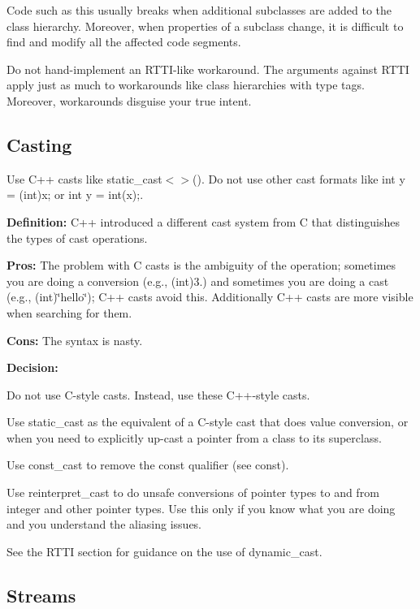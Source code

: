 Code such as this usually breaks when additional subclasses are added to the class hierarchy. Moreover, when properties of a subclass change, it is difficult to find and modify all the affected code segments.

Do not hand-\/implement an R\+T\+T\+I-\/like workaround. The arguments against R\+T\+TI apply just as much to workarounds like class hierarchies with type tags. Moreover, workarounds disguise your true intent.

\subsection*{Casting}

Use C++ casts like {\ttfamily static\+\_\+cast$<$$>$()}. Do not use other cast formats like {\ttfamily int y = (int)x; or int y = int(x);}.

{\bfseries Definition\+:} C++ introduced a different cast system from C that distinguishes the types of cast operations.

{\bfseries Pros\+:} The problem with C casts is the ambiguity of the operation; sometimes you are doing a conversion (e.\+g., (int)3.) and sometimes you are doing a cast (e.\+g., (int)\char`\"{}hello\char`\"{}); C++ casts avoid this. Additionally C++ casts are more visible when searching for them.

{\bfseries Cons\+:} The syntax is nasty.

{\bfseries Decision\+:}

Do not use C-\/style casts. Instead, use these C++-\/style casts.


\begin{DoxyItemize}
\item Use {\ttfamily static\+\_\+cast} as the equivalent of a C-\/style cast that does value conversion, or when you need to explicitly up-\/cast a pointer from a class to its superclass.
\item Use {\ttfamily const\+\_\+cast} to remove the const qualifier (see const).
\item Use {\ttfamily reinterpret\+\_\+cast} to do unsafe conversions of pointer types to and from integer and other pointer types. Use this only if you know what you are doing and you understand the aliasing issues.
\end{DoxyItemize}

See the R\+T\+TI section for guidance on the use of dynamic\+\_\+cast.

\subsection*{Streams}

